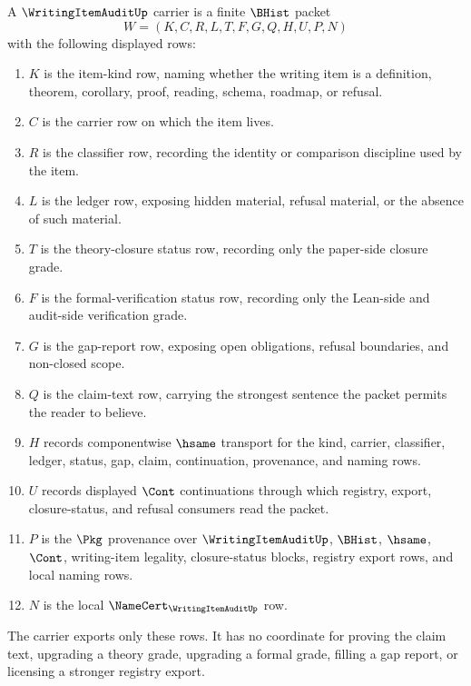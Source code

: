 \begin{definition}
\label{def:writing-item-audit-carrier}
A $\WritingItemAuditUp$ carrier is a finite $\BHist$ packet
$$
W=(K,C,R,L,T,F,G,Q,H,U,P,N)
$$
with the following displayed rows:
\begin{enumerate}
\item $K$ is the item-kind row, naming whether the writing item is a definition, theorem, corollary, proof, reading, schema, roadmap, or refusal.
\item $C$ is the carrier row on which the item lives.
\item $R$ is the classifier row, recording the identity or comparison discipline used by the item.
\item $L$ is the ledger row, exposing hidden material, refusal material, or the absence of such material.
\item $T$ is the theory-closure status row, recording only the paper-side closure grade.
\item $F$ is the formal-verification status row, recording only the Lean-side and audit-side verification grade.
\item $G$ is the gap-report row, exposing open obligations, refusal boundaries, and non-closed scope.
\item $Q$ is the claim-text row, carrying the strongest sentence the packet permits the reader to believe.
\item $H$ records componentwise $\hsame$ transport for the kind, carrier, classifier, ledger, status, gap, claim, continuation, provenance, and naming rows.
\item $U$ records displayed $\Cont$ continuations through which registry, export, closure-status, and refusal consumers read the packet.
\item $P$ is the $\Pkg$ provenance over $\WritingItemAuditUp$, $\BHist$, $\hsame$, $\Cont$, writing-item legality, closure-status blocks, registry export rows, and local naming rows.
\item $N$ is the local $\NameCert_{\WritingItemAuditUp}$ row.
\end{enumerate}
The carrier exports only these rows. It has no coordinate for proving the claim text, upgrading a theory grade, upgrading a formal grade, filling a gap report, or licensing a stronger registry export.
\end{definition}

